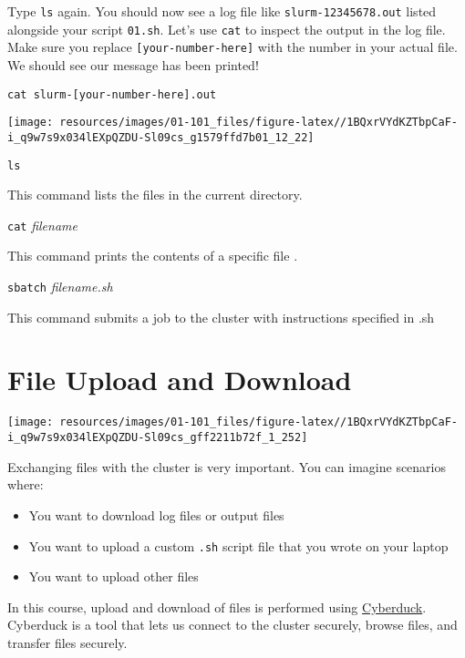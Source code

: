 \documentclass[
]{book}
\providecommand{\tightlist}{%
  \setlength{\itemsep}{0pt}\setlength{\parskip}{0pt}}
\begin{document}
Type \texttt{ls} again. You should now see a log file like \texttt{slurm-12345678.out} listed alongside your script \texttt{01.sh}. Let's use \texttt{cat} to inspect the output in the log file. Make sure you replace \texttt{{[}your-number-here{]}} with the number in your actual file. We should see our message has been printed!

\begin{verbatim}
cat slurm-[your-number-here].out
\end{verbatim}

\texttt{[image: resources/images/01-101\_files/figure-latex//1BQxrVYdKZTbpCaF-i\_q9w7s9x034lEXpQZDU-Sl09cs\_g1579ffd7b01\_12\_22]}

\texttt{ls}

This command lists the files in the current directory.

\texttt{cat} \emph{filename}

This command prints the contents of a specific file .

\texttt{sbatch} \emph{filename.sh}

This command submits a job to the cluster with instructions specified in .sh

\hypertarget{file-upload-and-download}{%
\chapter{File Upload and Download}\label{file-upload-and-download}}

\begin{center}\texttt{[image: resources/images/01-101\_files/figure-latex//1BQxrVYdKZTbpCaF-i\_q9w7s9x034lEXpQZDU-Sl09cs\_gff2211b72f\_1\_252]} \end{center}

Exchanging files with the cluster is very important. You can imagine scenarios where:

\begin{itemize}
\tightlist
\item
  You want to download log files or output files
\item
  You want to upload a custom \texttt{.sh} script file that you wrote on your laptop
\item
  You want to upload other files
\end{itemize}

In this course, upload and download of files is performed using \href{https://cyberduck.io/}{Cyberduck}. Cyberduck is a tool that lets us connect to the cluster securely, browse files, and transfer files securely.
\end{document}
